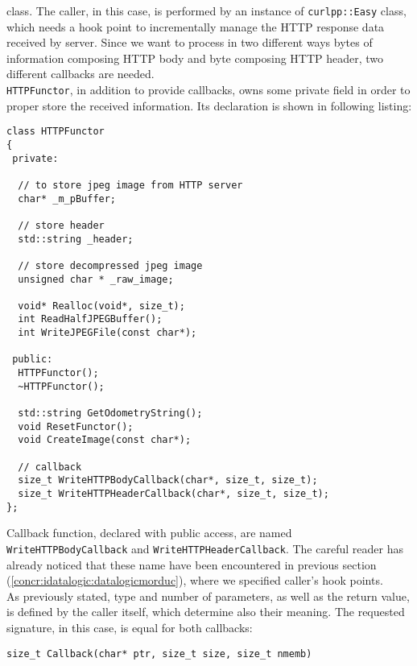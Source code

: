 class. The caller, in this case, is performed by an instance of
\texttt{curlpp::Easy} class, which needs a hook point to incrementally
manage the HTTP response data received by server. Since we want to
process in two different ways bytes of information composing HTTP body
and byte composing HTTP header, two different callbacks are needed.
\\
\texttt{HTTPFunctor}, in addition to provide callbacks, owns some
private field in order to proper store the received information. Its
declaration is shown in following listing:
\\
\begin{lstlisting}[caption={\texttt{HTTPFunctor} declaration},
    label={code:datalogiclogsimulator:httpfunctor:declaration}]
class HTTPFunctor
{
 private:

  // to store jpeg image from HTTP server
  char* _m_pBuffer;

  // store header
  std::string _header;

  // store decompressed jpeg image
  unsigned char * _raw_image;

  void* Realloc(void*, size_t);
  int ReadHalfJPEGBuffer();
  int WriteJPEGFile(const char*);

 public:
  HTTPFunctor();
  ~HTTPFunctor();

  std::string GetOdometryString();
  void ResetFunctor();
  void CreateImage(const char*);

  // callback
  size_t WriteHTTPBodyCallback(char*, size_t, size_t);
  size_t WriteHTTPHeaderCallback(char*, size_t, size_t);
};
\end{lstlisting}

Callback function, declared with public access, are named
\texttt{WriteHTTPBodyCallback} and \texttt{WriteHTTPHeaderCallback}.
The
careful reader has already noticed that these name have been
encountered in previous section
(\ref{concr:idatalogic:datalogicmorduc}), where we specified
caller's hook points.
\\
As previously stated, type and number of parameters, as well
as the return value, is defined by the caller itself, which
determine also their meaning. The requested signature, in this
case, is equal for both callbacks:

\begin{center}
  \texttt{size\_t Callback(char* ptr, size\_t size, size\_t nmemb)}
\end{center}

